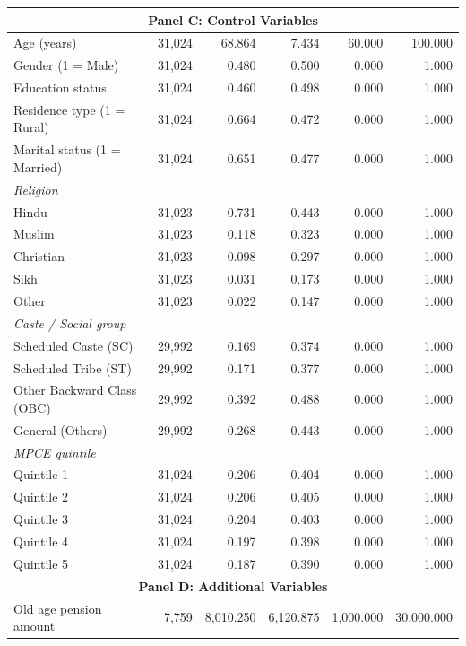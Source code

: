 \begin{table}[H]
{\begin{tabular}{lrrrrr}
\midrule
\multicolumn{6}{c}{\textbf{Panel C: Control Variables}} \\
\midrule
Age (years) & 31,024 & 68.864 & 7.434 & 60.000 & 100.000 \\
Gender (1 = Male) & 31,024 & 0.480 & 0.500 & 0.000 & 1.000 \\
Education status & 31,024 & 0.460 & 0.498 & 0.000 & 1.000 \\
Residence type (1 = Rural) & 31,024 & 0.664 & 0.472 & 0.000 & 1.000 \\
Marital status (1 = Married) & 31,024 & 0.651 & 0.477 & 0.000 & 1.000 \\
\textit{\quad Religion} & & & & & \\
\quad \quad Hindu & 31,023 & 0.731 & 0.443 & 0.000 & 1.000 \\
\quad \quad Muslim & 31,023 & 0.118 & 0.323 & 0.000 & 1.000 \\
\quad \quad Christian & 31,023 & 0.098 & 0.297 & 0.000 & 1.000 \\
\quad \quad Sikh & 31,023 & 0.031 & 0.173 & 0.000 & 1.000 \\
\quad \quad Other & 31,023 & 0.022 & 0.147 & 0.000 & 1.000 \\
\textit{\quad Caste / Social group} & & & & & \\
\quad \quad Scheduled Caste (SC) & 29,992 & 0.169 & 0.374 & 0.000 & 1.000 \\
\quad \quad Scheduled Tribe (ST) & 29,992 & 0.171 & 0.377 & 0.000 & 1.000 \\
\quad \quad Other Backward Class (OBC) & 29,992 & 0.392 & 0.488 & 0.000 & 1.000 \\
\quad \quad General (Others) & 29,992 & 0.268 & 0.443 & 0.000 & 1.000 \\
\textit{\quad MPCE quintile} & & & & & \\
\quad \quad Quintile 1 & 31,024 & 0.206 & 0.404 & 0.000 & 1.000 \\
\quad \quad Quintile 2 & 31,024 & 0.206 & 0.405 & 0.000 & 1.000 \\
\quad \quad Quintile 3 & 31,024 & 0.204 & 0.403 & 0.000 & 1.000 \\
\quad \quad Quintile 4 & 31,024 & 0.197 & 0.398 & 0.000 & 1.000 \\
\quad \quad Quintile 5 & 31,024 & 0.187 & 0.390 & 0.000 & 1.000 \\
\midrule
\multicolumn{6}{c}{\textbf{Panel D: Additional Variables}} \\
\midrule
Old age pension amount & 7,759 & 8,010.250 & 6,120.875 & 1,000.000 & 30,000.000 \\

\end{tabular}}
\end{table}
